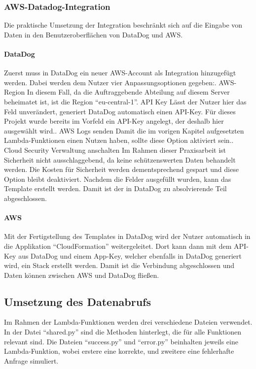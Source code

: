 	\subsubsection{AWS-Datadog-Integration}
	Die praktische Umsetzung der Integration beschränkt sich auf die Eingabe von Daten in den Benutzeroberflächen von DataDog und AWS.
	\paragraph{DataDog}
	Zuerst muss in DataDog ein neuer AWS-Account als Integration hinzugefügt werden. Dabei werden dem Nutzer vier Anpassungsoptionen gegeben:. AWS-Region\newline
	In diesem Fall, da die Auftraggebende Abteilung auf diesem Server beheimatet ist, ist die Region ``eu-central-1''. API Key\newline
	Lässt der Nutzer hier das Feld unverändert, generiert DataDog automatisch einen API-Key. Für dieses Projekt wurde bereits im Vorfeld ein API-Key angelegt, der deshalb hier ausgewählt wird.. AWS Logs senden\newline
	Damit die im vorigen Kapitel aufgesetzten Lambda-Funktionen einen Nutzen haben, sollte diese Option aktiviert sein.. Cloud Security Verwaltung anschalten\newline
	Im Rahmen dieser Praxisarbeit ist Sicherheit nicht ausschlaggebend, da keine schützenswerten Daten behandelt werden. Die Kosten für Sicherheit werden dementsprechend gespart und diese Option bleibt deaktiviert.\newline
	\newline
	Nachdem die Felder ausgefüllt wurden, kann das Template erstellt werden. Damit ist der in DataDog zu absolvierende Teil abgeschlossen. \newline
	\paragraph{AWS}
	Mit der Fertigstellung des Templates in DataDog wird der Nutzer automatisch in die Applikation ``CloudFormation'' weitergeleitet. Dort kann dann mit dem API-Key aus DataDog und einem App-Key, welcher ebenfalls in DataDog generiert wird, ein Stack erstellt werden. Damit ist die Verbindung abgeschlossen und Daten können zwischen AWS und DataDog fließen.
\subsection{Umsetzung des Datenabrufs}
	Im Rahmen der Lambda-Funktionen werden drei verschiedene Dateien verwendet. In der Datei ``shared.py'' sind die Methoden hinterlegt, die für alle Funktionen relevant sind. Die Dateien ``success.py'' und ``error.py'' beinhalten jeweils eine Lambda-Funktion, wobei erstere eine korrekte, und zweitere eine fehlerhafte Anfrage simuliert. 
